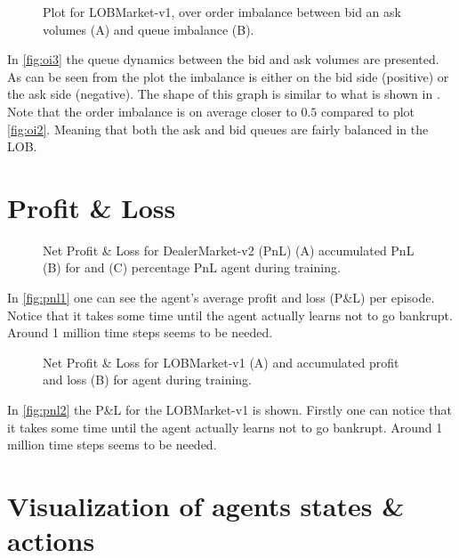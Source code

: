 \documentclass{kththesis}
\theoremstyle{definition}
\begin{document}
\begin{figure}[H]
	    	\centering
		
		\caption{Plot for LOBMarket-v1, over order imbalance between bid an ask volumes (A) and queue imbalance (B).}
		\label{fig:oi3}
\end{figure}
In \autoref{fig:oi3} the queue dynamics between the bid and ask volumes are presented. As can be seen from the plot the imbalance is either on the bid side (positive) or the ask side (negative). The shape of this graph is similar to what is shown in \parencite{bouchaud2018trades}. Note that the order imbalance is on average closer to $0.5$ compared to plot \autoref{fig:oi2}. Meaning that both the ask and bid queues are fairly balanced in the LOB.

\section{Profit \& Loss}

\begin{figure}[H]
    \centering
    
    \caption{Net Profit \& Loss for DealerMarket-v2 (PnL) (A) accumulated PnL (B) for and (C) percentage PnL agent during training.}
    \label{fig:pnl1}
\end{figure}
In \autoref{fig:pnl1} one can see the agent's average profit and loss (P\&L) per episode. Notice that it takes some time until the agent actually learns not to go bankrupt. Around 1 million time steps seems to be needed. 


\begin{figure}[H]
    \centering
    
    \caption{Net Profit \& Loss for LOBMarket-v1 (A) and accumulated profit and loss (B) for agent during training.}
    \label{fig:pnl2}
\end{figure}
In \autoref{fig:pnl2} the P\&L for the LOBMarket-v1 is shown. Firstly one can notice that it takes some time until the agent actually learns not to go bankrupt. Around 1 million time steps seems to be needed. 

\section{Visualization of agents states \& actions}
\end{document}
